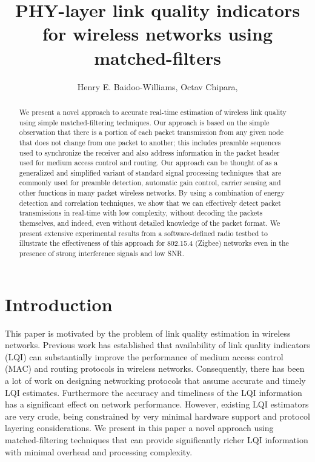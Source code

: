 \documentclass[journal]{IEEEtran}
\begin{document}
\title{PHY-layer link quality indicators for wireless networks using
matched-filters}

\author{Henry E. Baidoo-Williams, Octav Chipara, 
 }

\maketitle

\begin{abstract}

We present a novel approach to accurate real-time estimation of wireless link
quality using simple matched-filtering techniques. Our approach is based on the
simple observation that there is a portion of each packet transmission from any
given node that does not change from one packet to another; this includes
preamble sequences used to synchronize the receiver and also address
information in the packet header used for medium access control and routing.
Our approach can be thought of as a generalized and simplified variant of
standard signal processing techniques that are commonly used for preamble
detection, automatic gain control, carrier sensing and other functions in many
packet wireless networks. By using a combination of energy detection and
correlation techniques, we show that we can effectively detect packet
transmissions in real-time with low complexity, without decoding the packets
themselves, and indeed, even without detailed knowledge of the packet format.
We present extensive experimental results from a software-defined radio testbed
to illustrate the effectiveness of this approach for 802.15.4 (Zigbee) networks
even in the presence of strong interference signals and low SNR.
 
\end{abstract}


\section{Introduction} \label{sec:intro}

This paper is motivated by the problem of link quality estimation in wireless
networks. Previous work has established that availability of link quality
indicators (LQI) can substantially improve the performance of medium access
control (MAC) and routing protocols in wireless networks. Consequently, there
has been a lot of work on designing networking protocols that assume accurate
and timely LQI estimates. Furthermore the accuracy and timeliness of the LQI
information has a significant effect on network performance. However, existing
LQI estimators are very crude, being constrained by very minimal hardware
support and protocol layering considerations. We present in this paper a novel
approach using matched-filtering techniques that can provide significantly
richer LQI information with minimal overhead and processing complexity.
\end{document}
